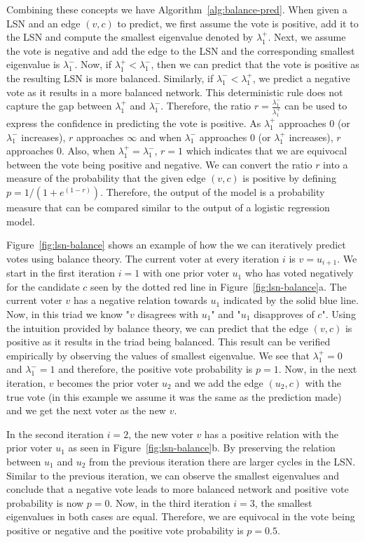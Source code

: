 Combining these concepts we have Algorithm~\ref{alg:balance-pred}.
When given a LSN and an edge $(v,c)$ to predict, we first assume the vote is positive, add it to the LSN and compute the smallest eigenvalue denoted by $\lambda_1^{+}$.
Next, we assume the vote is negative and add the edge to the LSN and the corresponding smallest eigenvalue is $\lambda_1^-$.
Now, if $\lambda_1^+ < \lambda_1^-$, then we can predict that the vote is positive as the resulting LSN is more balanced.
Similarly, if $\lambda_1^-<\lambda_1^+$, we predict a negative vote as it results in a more balanced network.
This deterministic rule does not capture the gap between $\lambda_1^+$ and $\lambda_1^-$.
Therefore, the ratio $r=\frac{\lambda_1^-}{\lambda_1^+}$ can be used to express the confidence in predicting the vote is positive.
As $\lambda_1^+$ approaches $0$ (or $\lambda_1^-$ increases), $r$ approaches $\infty$ and when $\lambda_1^-$ approaches $0$ (or $\lambda_1^+$ increases), $r$ approaches $0$.
Also, when $\lambda_1^+=\lambda_1^-$, $r=1$ which indicates that we are equivocal between the vote being positive and negative.
We can convert the ratio $r$ into a measure of the probability that the given edge $(v,c)$ is positive by defining $p=1/(1+e^{(1-r)})$.
Therefore, the output of the model is a probability measure that can be compared similar to the output of a logistic regression model.

Figure~\ref{fig:lsn-balance} shows an example of how the we can iteratively predict votes using balance theory.
The current voter at every iteration $i$ is $v=u_{i+1}$.
We start in the first iteration $i=1$ with one prior voter $u_1$ who has voted negatively for the candidate $c$ seen by the dotted red line in Figure~\ref{fig:lsn-balance}a.
The current voter $v$ has a negative relation towards $u_1$ indicated by the solid blue line.
Now, in this triad we know "$v$ disagrees with $u_1$" and "$u_1$ disapproves of $c$".
Using the intuition provided by balance theory, we can predict that the edge $(v,c)$ is positive as it results in the triad being balanced.
This result can be verified empirically by observing the values of smallest eigenvalue.
We see that $\lambda_1^+=0$ and $\lambda_1^-=1$ and therefore, the positive vote probability is $p=1$.
Now, in the next iteration, $v$ becomes the prior voter $u_2$ and we add the edge $(u_2,c)$ with the true vote (in this example we assume it was the same as the prediction made) and we get the next voter as the new $v$.

In the second iteration $i=2$, the new voter $v$ has a positive relation with the prior voter $u_1$ as seen in Figure~\ref{fig:lsn-balance}b.
By preserving the relation between $u_1$ and $u_2$ from the previous iteration there are larger cycles in the LSN.
Similar to the previous iteration, we can observe the smallest eigenvalues and conclude that a negative vote leads to more balanced network and positive vote probability is now $p=0$.
Now, in the third iteration $i=3$, the smallest eigenvalues in both cases are equal.
Therefore, we are equivocal in the vote being positive or negative and the positive vote probability is $p=0.5$.

